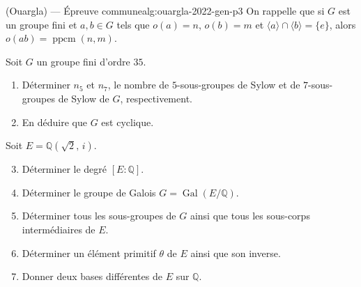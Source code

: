 \newpage

\begin{problem}{(Ouargla) — Épreuve commune}{alg:ouargla-2022-gen-p3}
On rappelle que si $G$ est un groupe fini et $a,b\in G$ tels que $o(a)=n$,
$o(b)=m$ et $\langle a\rangle\cap\langle b\rangle=\{e\}$, alors
$o(ab)=\operatorname{ppcm}(n,m)$.

Soit $G$ un groupe fini d'ordre $35$.
\begin{enumerate}
\item Déterminer $n_5$ et $n_7$, le nombre de $5$-sous-groupes de Sylow et de
      $7$-sous-groupes de Sylow de $G$, respectivement.
\item En déduire que $G$ est cyclique.
\end{enumerate}
Soit $E=\mathbb{Q}\!\left(\sqrt{2},\,i\right)$.
\begin{enumerate}
\setcounter{enumi}{2}
\item Déterminer le degré $[E:\mathbb{Q}]$.
\item Déterminer le groupe de Galois $G=\operatorname{Gal}(E/\mathbb{Q})$.
\item Déterminer tous les sous-groupes de $G$ ainsi que tous les sous-corps
      intermédiaires de $E$.
\item Déterminer un élément primitif $\theta$ de $E$ ainsi que son inverse.
\item Donner deux bases différentes de $E$ sur $\mathbb{Q}$.
\end{enumerate}

\end{problem}

\newpage

